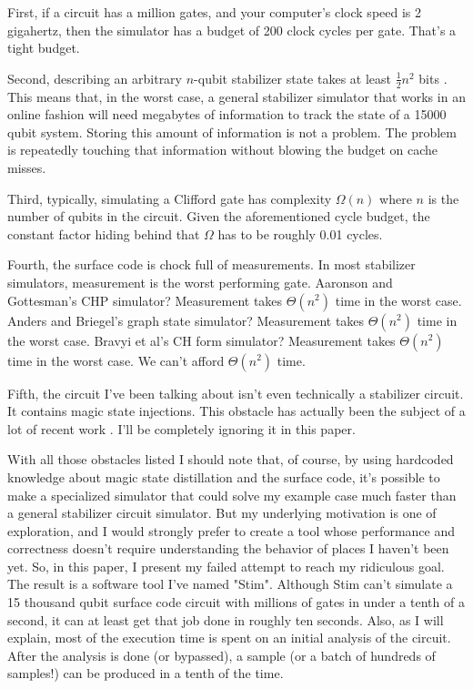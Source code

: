 \documentclass[onecolumn,unpublished]{quantumarticle}
\theoremstyle{definition}
\theoremstyle{definition}
\theoremstyle{definition}
\begin{document}
First, if a circuit has a million gates, and your computer's clock speed is 2 gigahertz, then the simulator has a budget of 200 clock cycles per gate.
That's a tight budget.

Second, describing an arbitrary $n$-qubit stabilizer state takes at least $\frac{1}{2} n^2$ bits \cite{gross2006hudson,howmanystabilizers2021}.
This means that, in the worst case, a general stabilizer simulator that works in an online fashion will need megabytes of information to track the state of a 15000 qubit system.
Storing this amount of information is not a problem.
The problem is repeatedly touching that information without blowing the budget on cache misses.

Third, typically, simulating a Clifford gate has complexity $\Omega(n)$ where $n$ is the number of qubits in the circuit.
Given the aforementioned cycle budget, the constant factor hiding behind that $\Omega$ has to be roughly 0.01 cycles.

Fourth, the surface code is chock full of measurements.
In most stabilizer simulators, measurement is the worst performing gate.
Aaronson and Gottesman's\cite{aaronson2004chp} CHP simulator?
Measurement takes $\Theta(n^2)$ time in the worst case.
Anders and Briegel's\cite{anders2006fastgraphsim} graph state simulator?
Measurement takes $\Theta(n^2)$ time in the worst case.
Bravyi et al's\cite{bravyi2019simulation} CH form simulator?
Measurement takes $\Theta(n^2)$ time in the worst case.
We can't afford $\Theta(n^2)$ time.

Fifth, the circuit I've been talking about isn't even technically a stabilizer circuit.
It contains magic state injections.
This obstacle has actually been the subject of a lot of recent work \cite{bravyi2019simulation,bu2019efficient,huang2020feynman,huang2019approximate}.
I'll be completely ignoring it in this paper.

With all those obstacles listed I should note that, of course, by using hardcoded knowledge about magic state distillation and the surface code, it's possible to make a specialized simulator that could solve my example case much faster than a general stabilizer circuit simulator.
But my underlying motivation is one of exploration, and I would strongly prefer to create a tool whose performance and correctness doesn't require understanding the behavior of places I haven't been yet.
So, in this paper, I present my failed attempt to reach my ridiculous goal.
The result is a software tool I've named "Stim".
Although Stim can't simulate a 15 thousand qubit surface code circuit with millions of gates in under a tenth of a second, it can at least get that job done in roughly ten seconds.
Also, as I will explain, most of the execution time is spent on an initial analysis of the circuit.
After the analysis is done (or bypassed), a sample (or a batch of hundreds of samples!) can be produced in a tenth of the time.
\end{document}
